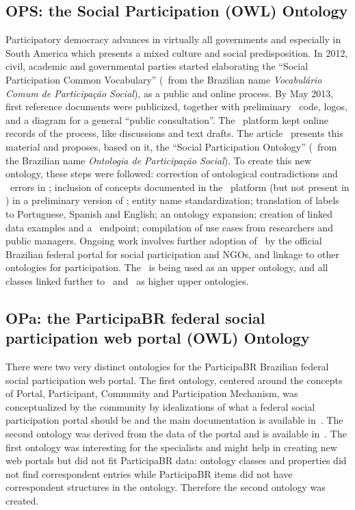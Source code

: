 \begin{apendicesenv}
\subsection{OPS: the Social Participation (OWL) Ontology}
Participatory democracy advances in virtually all governments and especially in South America which presents a mixed culture and social predisposition.
 In 2012, civil, academic and governmental parties started elaborating the ``Social Participation Common Vocabulary'' (\vcps\ from the Brazilian name \emph{Vocabul\'ario Comum de Participa\c{c}\~ao Social}), as a public and online process. By May 2013, first reference documents were publicized, together with preliminary \owl\ code, logos, and a diagram for a general ``public consultation''.
The \corais\ platform kept online records of the process, like discussions and text drafts. 
The article~\cite{ops} presents this material and proposes, based on it, the ``Social Participation Ontology'' (\ops\ from the Brazilian name \emph{Ontologia de Participa\c{c}\~ao Social}). To create  this new ontology, these steps were followed: correction of ontological contradictions and \owl\ errors in \vcps; inclusion of concepts documented in the \corais\ platform (but not present in \vcps) in a preliminary version of \ops; entity name standardization; translation of labels to Portuguese, Spanish and English; an ontology expansion; creation of linked data examples and  a \sparql\ endpoint; compilation of use cases from researchers and public managers. Ongoing work involves further adoption of \ops\ by the official Brazilian federal portal for social participation and  NGOs, and linkage to other ontologies for participation. The \ops\ is being used as an upper ontology, and all classes linked further to \foaf\ and \bfo\ as higher upper ontologies.

\subsection{OPa: the ParticipaBR federal social participation web portal (OWL) Ontology}\label{sec:opa}
There were two very distinct ontologies for the ParticipaBR Brazilian federal social participation web portal.
The first ontology, centered around the concepts of Portal, Participant, Community and Participation Mechanism,
was conceptualized by the community by idealizations of what a
federal social participation portal should be and the main documentation is available in~\cite{opa0}.
The second ontology was derived from the data of the portal and is available in~\cite{opa}.
The first ontology was interesting for the specialists and might help in creating new web portals but did not fit
ParticipaBR data: ontology classes and properties did not find correspondent entries while
ParticipaBR items did not have correspondent structures in the ontology.
Therefore the second ontology was created.


\end{apendicesenv}
